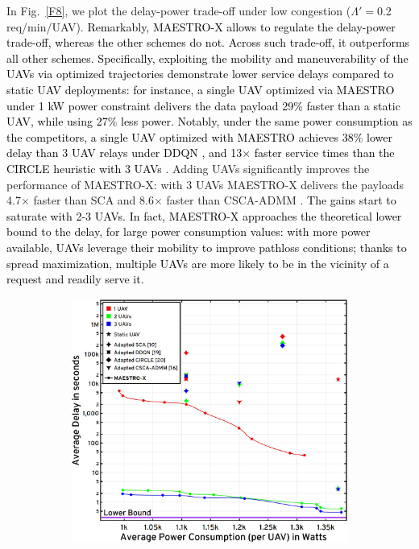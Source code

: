 \documentclass[10pt, twocolumn]{IEEEtran}
\theoremstyle{plain}
\theoremstyle{definition}
\theoremstyle{remark}
\newcommand\hlt[1]{\textcolor{black}{#1}}
\begin{document}
{In Fig.~\ref{F8}, we plot the delay-power trade-off under low congestion ($\Lambda'{=}$0.2 req/min/UAV).
\hlt{Remarkably, MAESTRO-X allows to regulate the delay-power trade-off, whereas the other schemes do not.
Across such trade-off, it outperforms all other schemes.}
\hlt{Specifically,
exploiting the mobility and maneuverability of the UAVs via optimized trajectories demonstrate lower service delays compared to static UAV deployments: for instance, a single UAV optimized via MAESTRO under 1 kW power constraint delivers the data payload 29\% faster than a static UAV, while using 27\% less power. 
Notably, under the same power consumption as the competitors, a single UAV optimized with MAESTRO achieves 38\% lower delay than 3 UAV relays  under DDQN \cite{DDQN}, and 13$\times$ faster service times than the CIRCLE heuristic with 3 UAVs \cite{MEC-DDPG}}. 
Adding UAVs significantly improves the performance of MAESTRO-X: with 3 UAVs MAESTRO-X delivers the payloads 4.7${\times}$ faster than SCA \cite{SCA} and 8.6$\times$ faster than CSCA-ADMM \cite{CSCA-ADMM}.
\hlt{The  gains start to saturate with 2-3 UAVs. In fact,
MAESTRO-X approaches the theoretical lower bound to the delay, for large power consumption values:
with more power available, UAVs leverage their mobility to improve pathloss conditions;
 thanks to spread maximization, multiple UAVs are more likely to be in the vicinity of a request and readily serve it.}
\begin{figure} [t]
     \begin{subfigure}{0.55\linewidth}
         \centering
         \includegraphics[width=1.0\linewidth]{figs/Delay_Power_10Mb_Scatter_High_Congestion.jpg}

\end{subfigure}
\end{figure}}
\end{document}
